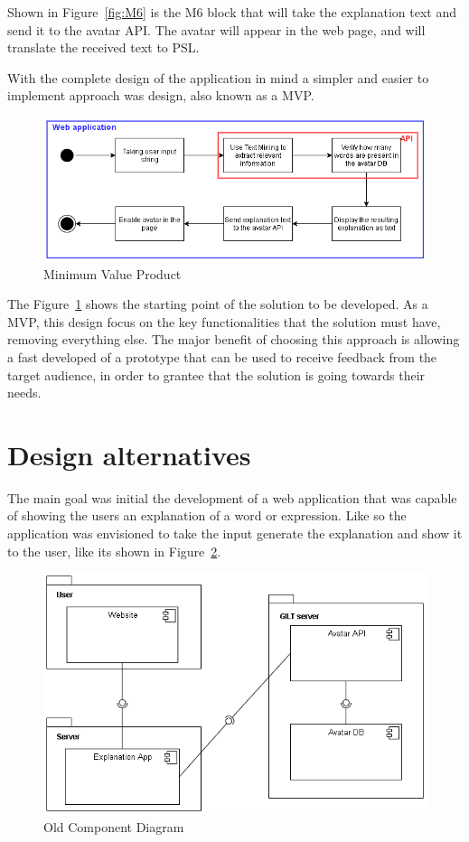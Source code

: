 Shown in Figure~\ref{fig:M6} is the M6 block that will take the explanation text and send it to the avatar \gls{API}.
The avatar will appear in the web page, and will translate the received text to \gls{PSL}.

With the complete design of the application in mind a simpler and easier to implement approach was design, also known as a \gls{MVP}.

\begin{figure}[H]
\centering
\includegraphics[scale=0.5]{ch4/assets/mvp_2.png}
\caption[Minimun Value Product]{Minimum Value Product}
\label{fig:mvp}
\end{figure}

The Figure~\ref{fig:mvp} shows the starting point of the solution to be developed.
As a \gls{MVP}, this design focus on the key functionalities that the solution must have, removing everything else.
The major benefit of choosing this approach is allowing a fast developed of a prototype that can be used to receive feedback from the target audience, in order to grantee that the solution is going towards their needs.

\section{Design alternatives}

The main goal was initial the development of a web application that was capable of showing the users an explanation of a word or expression.
Like so the application was envisioned to take the input generate the explanation and show it to the user, like its shown in Figure~\ref{fig:ocd}.

\begin{figure}[H]
\centering
\includegraphics[scale=0.5]{ch4/assets/component_diagram_old.png}
\caption[Old Component Diagram]{Old Component Diagram}
\label{fig:ocd}
\end{figure}

